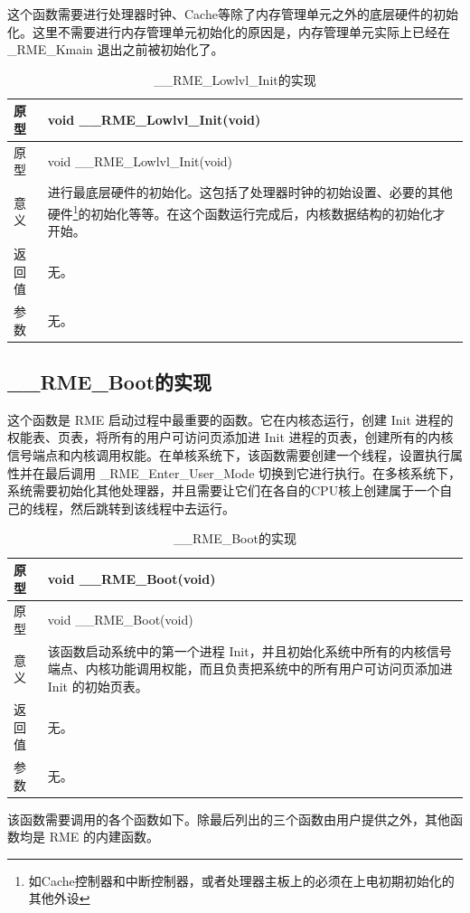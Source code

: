 这个函数需要进行处理器时钟、Cache等除了内存管理单元之外的底层硬件的初始化。这里不需要进行内存管理单元初始化的原因是，内存管理单元实际上已经在\_RME\_Kmain 退出之前被初始化了。

\begin{xltabular}{\textwidth}{@{}>{\hsize\raggedright\arraybackslash}X>{\hsize\raggedright\arraybackslash}X@{}}
\caption{\_\_RME\_Lowlvl\_Init的实现}\label{tab:7-35-rme-lowlvl-init-implementation}\\
\toprule
原型 & void \_\_RME\_Lowlvl\_Init(void)\tabularnewline
\endfirsthead
\toprule
原型 & void \_\_RME\_Lowlvl\_Init(void)\tabularnewline
\midrule
\endhead
\bottomrule
\endlastfoot
意义 &
进行最底层硬件的初始化。这包括了处理器时钟的初始设置、必要的其他硬件\footnote{如Cache控制器和中断控制器，或者处理器主板上的必须在上电初期初始化的其他外设}的初始化等等。在这个函数运行完成后，内核数据结构的初始化才开始。\tabularnewline
返回值 & 无。\tabularnewline
参数 & 无。\tabularnewline
\end{xltabular}

\subsection{\_\_RME\_Boot的实现}\label{subsec:7-rme-boot-implementation}

这个函数是 RME 启动过程中最重要的函数。它在内核态运行，创建 Init 进程的权能表、页表，将所有的用户可访问页添加进 Init 进程的页表，创建所有的内核信号端点和内核调用权能。在单核系统下，该函数需要创建一个线程，设置执行属性并在最后调用 \_RME\_Enter\_User\_Mode 切换到它进行执行。在多核系统下，系统需要初始化其他处理器，并且需要让它们在各自的CPU核上创建属于一个自己的线程，然后跳转到该线程中去运行。

\begin{xltabular}{\textwidth}{@{}>{\hsize\raggedright\arraybackslash}X>{\hsize\raggedright\arraybackslash}X@{}}
\caption{\_\_RME\_Boot的实现}\label{tab:7-36-rme-boot-implementation}\\
\toprule
原型 & void \_\_RME\_Boot(void)\tabularnewline
\endfirsthead
\toprule
原型 & void \_\_RME\_Boot(void)\tabularnewline
\midrule
\endhead
\bottomrule
\endlastfoot
意义 &
该函数启动系统中的第一个进程 Init，并且初始化系统中所有的内核信号端点、内核功能调用权能，而且负责把系统中的所有用户可访问页添加进 Init 的初始页表。\tabularnewline
返回值 & 无。\tabularnewline
参数 & 无。\tabularnewline
\end{xltabular}

该函数需要调用的各个函数如下。除最后列出的三个函数由用户提供之外，其他函数均是 RME 的内建函数。

